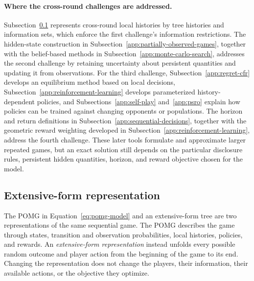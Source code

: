 \paragraph{Where the cross-round challenges are addressed.}
Subsection~\ref{app:extensive-form} represents cross-round local histories by tree histories and information sets, which enforce the first challenge's information restrictions. The hidden-state construction in Subsection~\ref{app:partially-observed-games}, together with the belief-based methods in Subsection~\ref{app:monte-carlo-search}, addresses the second challenge by retaining uncertainty about persistent quantities and updating it from observations. For the third challenge, Subsection~\ref{app:regret-cfr} develops an equilibrium method based on local decisions, Subsection~\ref{app:reinforcement-learning} develops parameterized history-dependent policies, and Subsections~\ref{app:self-play} and~\ref{app:psro} explain how policies can be trained against changing opponents or populations. The horizon and return definitions in Subsection~\ref{app:sequential-decisions}, together with the geometric reward weighting developed in Subsection~\ref{app:reinforcement-learning}, address the fourth challenge. These later tools formulate and approximate larger repeated games, but an exact solution still depends on the particular disclosure rules, persistent hidden quantities, horizon, and reward objective chosen for the model.

\subsection{Extensive-form representation}
\label{app:extensive-form}

The POMG in Equation~\eqref{eq:pomg-model} and an extensive-form tree are two representations of the same sequential game. The POMG describes the game through states, transition and observation probabilities, local histories, policies, and rewards. An \emph{extensive-form representation} instead unfolds every possible random outcome and player action from the beginning of the game to its end. Changing the representation does not change the players, their information, their available actions, or the objective they optimize.

